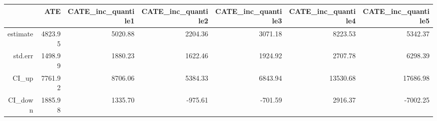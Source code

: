\begin{table}[ht]
\centering
\begin{tabular}{rrrrrrr}
  \hline
 & ATE & CATE\_inc\_quantile1 & CATE\_inc\_quantile2 & CATE\_inc\_quantile3 & CATE\_inc\_quantile4 & CATE\_inc\_quantile5 \\ 
  \hline
estimate & 4823.95 & 5020.88 & 2204.36 & 3071.18 & 8223.53 & 5342.37 \\ 
  std.err & 1498.99 & 1880.23 & 1622.46 & 1924.92 & 2707.78 & 6298.39 \\ 
  CI\_up & 7761.92 & 8706.06 & 5384.33 & 6843.94 & 13530.68 & 17686.98 \\ 
  CI\_down & 1885.98 & 1335.70 & -975.61 & -701.59 & 2916.37 & -7002.25 \\ 
   \hline
\end{tabular}
\end{table}
